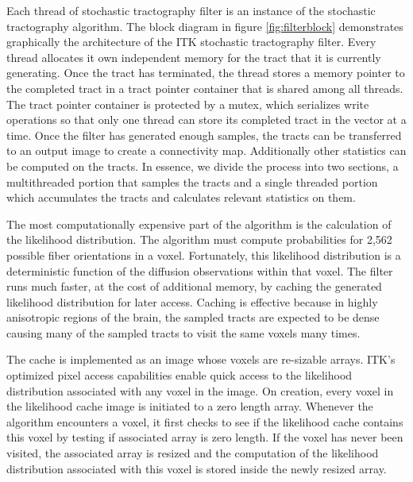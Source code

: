 \documentclass{InsightArticle}
\begin{document}
Each thread of stochastic tractography filter is an instance of the stochastic tractography algorithm. The block diagram in figure \ref{fig:filterblock} demonstrates graphically the architecture of the ITK stochastic tractography filter.  Every thread allocates it own independent memory for the tract that it is currently generating.  Once the tract has terminated, the thread stores a memory pointer to the completed tract in a tract pointer container that is shared among all threads.  The tract pointer container is protected by a mutex, which serializes write operations so that only one thread can store its completed tract in the vector at a time.  Once the filter has generated enough samples, the tracts can be transferred to an output image to create a connectivity map.  Additionally other statistics can be computed on the tracts.  In essence, we divide the process into two sections, a multithreaded portion that samples the tracts and a single threaded portion which accumulates the tracts and calculates relevant statistics on them.

The most computationally expensive part of the algorithm is the calculation of the likelihood distribution.  The algorithm must compute probabilities for 2,562 possible fiber orientations in a voxel.  Fortunately, this likelihood distribution is a deterministic function of the diffusion observations within that voxel.  The filter runs much faster, at the cost of additional memory, by caching the generated likelihood distribution for later access.  Caching is effective because in highly anisotropic regions of the brain, the sampled tracts are expected to be dense causing many of the sampled tracts to visit the same voxels many times.

The cache is implemented as an image whose voxels are re-sizable arrays.  ITK's optimized pixel access capabilities enable quick access to the likelihood distribution associated with any voxel in the image.  On creation, every voxel in the likelihood cache image is initiated to a zero length array.  Whenever the algorithm encounters a voxel, it first checks to see if the likelihood cache contains this voxel by testing if associated array is zero length.  If the voxel has never been visited, the associated array is resized and the computation of the likelihood distribution associated with this voxel is stored inside the newly resized array.
\end{document}
